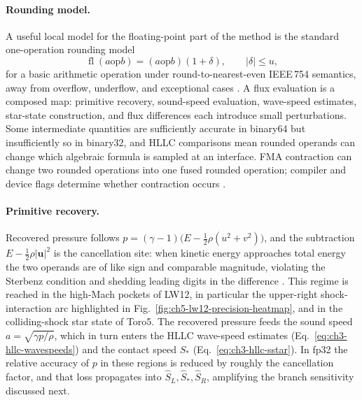 \paragraph{Rounding model.}
A useful local model for the floating-point part of the method is the standard
one-operation rounding model
\begin{equation}\label{eq:ch3-rounding-model}
  \operatorname{fl}(a \mathbin{\mathrm{op}} b)
  =
  (a \mathbin{\mathrm{op}} b)(1+\delta),
  \qquad |\delta|\le u ,
\end{equation}
for a basic arithmetic operation under round-to-nearest-even IEEE\,754 semantics,
away from overflow, underflow, and exceptional cases
\citep{ieee754_2019,goldberg_1991,higham_2002}. A flux evaluation is a composed
map: primitive recovery, sound-speed evaluation, wave-speed estimates, star-state
construction, and flux differences each introduce small perturbations. Some
intermediate quantities are sufficiently accurate in binary64 but insufficiently
so in binary32, and HLLC comparisons mean rounded operands can change which
algebraic formula is sampled at an interface. FMA contraction can change two
rounded operations into one fused rounded operation; compiler and device flags
determine whether contraction occurs \citep{ieee754_2019,higham_2002}.

\paragraph{Primitive recovery.}
Recovered pressure follows
\(p = (\gamma-1)\bigl(E - \tfrac{1}{2}\rho(u^2+v^2)\bigr)\),
and the subtraction \(E - \tfrac{1}{2}\rho\lvert\mathbf{u}\rvert^{2}\) is the
cancellation site: when kinetic energy approaches total energy the two operands
are of like sign and comparable magnitude, violating the Sterbenz condition and
shedding leading digits in the difference \citep{higham_2002}. This regime is
reached in the high-Mach pockets of LW12, in particular the upper-right
shock-interaction arc highlighted in Fig.~\ref{fig:ch5-lw12-precision-heatmap},
and in the colliding-shock star state of Toro5. The recovered pressure feeds
the sound speed \(a=\sqrt{\gamma p/\rho}\), which in turn enters the HLLC
wave-speed estimates (Eq.~\ref{eq:ch3-hllc-wavespeeds}) and the contact speed
\(S_\ast\) (Eq.~\ref{eq:ch3-hllc-sstar}). In fp32 the relative accuracy of \(p\)
in these regions is reduced by roughly the cancellation factor, and that loss
propagates into \(\widehat S_L,\widehat S_\ast,\widehat S_R\), amplifying the
branch sensitivity discussed next.

